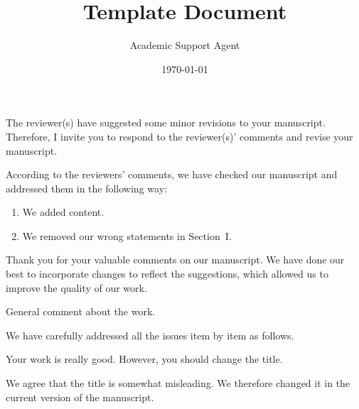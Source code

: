 \documentclass{article}
\title{Template Document}
\author{Academic Support Agent}
\date{\today}
\begin{document}
\maketitle

\maketitle



\editor
\begin{generalcomment}
	The reviewer(s) have suggested some minor revisions to your manuscript. Therefore, I invite you to respond to the reviewer(s)' comments and revise your manuscript.
\end{generalcomment}
\begin{revresponse}
	According to the reviewers' comments, we have checked our manuscript and addressed them in the following way:
	\begin{enumerate}
		\item We added content.
		\item We removed our wrong statements in Section~I.
	\end{enumerate}
\end{revresponse}
\begin{concludingresponse}
	Thank you for your valuable comments on our manuscript. 
	We have done our best to incorporate changes to reflect the suggestions, which allowed us to improve the quality of our work.
\end{concludingresponse}


\reviewer
\begin{generalcomment}
	General comment about the work.
\end{generalcomment}
\begin{revresponse}
	We have carefully addressed all the issues item by item as follows.
\end{revresponse}

\begin{revcomment}
	Your work is really good. However, you should change the title.
\end{revcomment}
\begin{revresponse}
	We agree that the title is somewhat misleading.
	We therefore changed it in the current version of the manuscript.
\end{revresponse}
\end{document}
